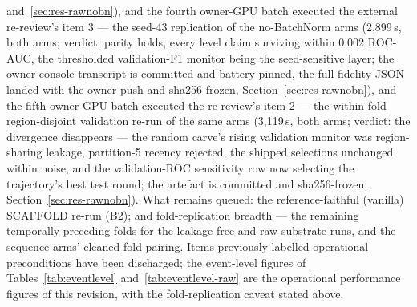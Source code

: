 and~\ref{sec:res-rawnobn}), and the fourth owner-GPU batch executed
the external re-review's item 3 --- the seed-43 replication of the
no-BatchNorm arms (2{,}899\,s, both arms; verdict: parity holds,
every level claim surviving within 0.002 ROC-AUC, the thresholded
validation-F1 monitor being the seed-sensitive layer; the owner
console transcript is committed and battery-pinned, the
full-fidelity JSON landed with the owner push and sha256-frozen,
Section~\ref{sec:res-rawnobn}), and the fifth owner-GPU batch
executed the re-review's item 2 --- the within-fold region-disjoint
validation re-run of the same arms (3{,}119\,s, both arms; verdict:
the divergence disappears --- the random carve's rising validation
monitor was region-sharing leakage, partition-5 recency rejected,
the shipped selections unchanged within noise, and the
validation-ROC sensitivity row now selecting the trajectory's best
test round; the artefact is committed and sha256-frozen,
Section~\ref{sec:res-rawnobn}).
What remains queued: the reference-faithful (vanilla) SCAFFOLD
re-run (B2); and fold-replication breadth --- the remaining
temporally-preceding folds for the leakage-free and raw-substrate
runs, and the sequence arms' cleaned-fold pairing.
Items previously labelled operational preconditions have
been discharged; the event-level figures of
Tables~\ref{tab:eventlevel} and~\ref{tab:eventlevel-raw} are the
operational performance figures of this revision, with the
fold-replication caveat stated above.
